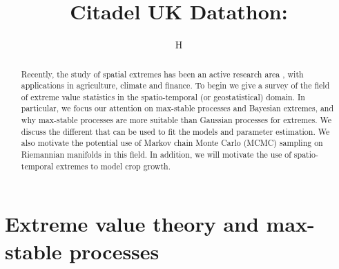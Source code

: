 \documentclass[12pt]{article}
\title{Citadel UK Datathon:}
\author{H\\ \smallskip
}
\theoremstyle{definition}
\theoremstyle{remark}
\theoremstyle{definition}
\theoremstyle{plain}
\begin{document}
\maketitle
\nocite{*}
\begin{abstract}
Recently, the study of spatial extremes has been an active research area \cite{Thibaud2015EfficientProcesses}, with applications in agriculture, climate and finance. To begin we give a survey of the field of extreme value statistics in the spatio-temporal (or geostatistical) domain. In particular, we focus our attention on max-stable processes and Bayesian extremes, and why max-stable processes are more suitable than Gaussian processes for extremes. We discuss the different that can be used to fit the models and parameter estimation. We also motivate the potential use of Markov chain Monte Carlo (MCMC) sampling on Riemannian manifolds in this field. In addition, we will motivate the use of spatio-temporal extremes to model crop growth.
\end{abstract}
\tableofcontents
\section{Extreme value theory and max-stable processes}
\end{document}
